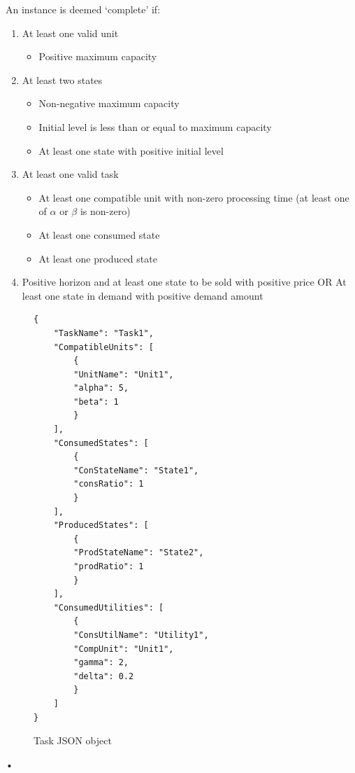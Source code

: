 An instance is deemed `complete' if:
\begin{enumerate}
\item At least one valid unit
\begin{itemize}
\item Positive maximum capacity
\end{itemize}
\item At least two states
\begin{itemize}
\item Non-negative maximum capacity
\item Initial level is less than or equal to maximum capacity
\item At least one state with positive initial level
\end{itemize}
\item At least one valid task
\begin{itemize}
\item At least one compatible unit with non-zero processing time (at least one of $\alpha$ or $\beta$ is non-zero)
\item At least one consumed state
\item At least one produced state
\end{itemize}
\item Positive horizon and at least one state to be sold with positive price OR At least one state in demand with positive demand amount
\end{enumerate}



\begin{figure}[htbp]

\begin{lstlisting}[xleftmargin=.2\textwidth, xrightmargin=.2\textwidth]
{
	"TaskName": "Task1",
	"CompatibleUnits": [
		{
		"UnitName": "Unit1",
		"alpha": 5,
		"beta": 1
		}
	],
	"ConsumedStates": [
		{
		"ConStateName": "State1",
		"consRatio": 1
		}
	],
	"ProducedStates": [
		{
		"ProdStateName": "State2",
		"prodRatio": 1
		}
	],
	"ConsumedUtilities": [
		{
		"ConsUtilName": "Utility1",
		"CompUnit": "Unit1",
		"gamma": 2,
		"delta": 0.2
		}
	]
}
\end{lstlisting}
\caption{Task JSON object}
\label{fig:taskJSON}
\end{figure}•


